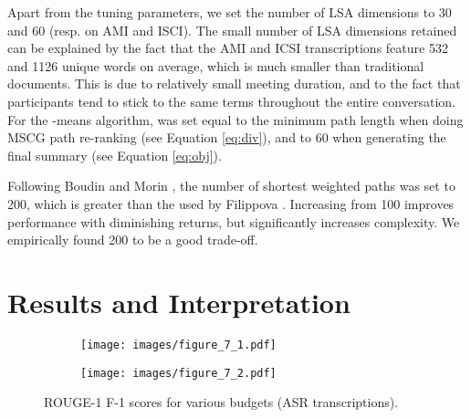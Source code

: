 \documentclass[11pt,a4paper]{article}
\begin{document}
\begin{table}[!ht]
\setlength{\tabcolsep}{3.2pt}
\small
\centering
{}
\caption{Optimal parameter values .}
\label{table:optimal_parameters}
\end{table}

Apart from the tuning parameters, we set the number of LSA dimensions to 30 and 60 (resp. on AMI and ISCI). The small number of LSA dimensions retained can be explained by the fact that the AMI and ICSI transcriptions feature 532 and 1126 unique words on average, which is much smaller than traditional documents. This is due to relatively small meeting duration, and to the fact that participants tend to stick to the same terms throughout the entire conversation. For the -means algorithm,  was set equal to the minimum path length  when doing MSCG path re-ranking (see Equation \ref{eq:div}), and to 60 when generating the final summary (see Equation \ref{eq:obj}).

Following Boudin and Morin , the number of shortest weighted paths  was set to 200, which is greater than the  used by Filippova . Increasing  from 100 improves performance with diminishing returns, but significantly increases complexity. We empirically found 200 to be a good trade-off.

\section{Results and Interpretation}

\begin{figure*}[ht]
\centering
\begin{subfigure}[t]{0.49\textwidth}
\centering
\texttt{[image: images/figure\_7\_1.pdf]}
\end{subfigure}
\begin{subfigure}[t]{0.49\textwidth}
\centering
\texttt{[image: images/figure\_7\_2.pdf]}
\end{subfigure}
\caption{ROUGE-1 F-1 scores for various budgets (ASR transcriptions).}
\label{fig:res}
\end{figure*}
\end{document}
